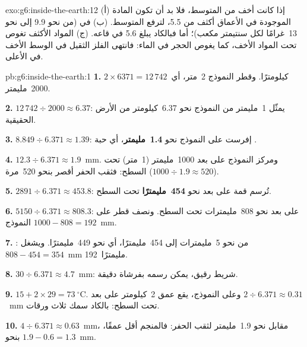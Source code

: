 \begin{solution}{exo:g6:inside-the-earth:12}
(أ) إذا كانت  أخف من المتوسط، فلا بد أن تكون المادة الموجودة في الأعماق
أكثف من 5.5، لترفع المتوسط. (ب) في   (من نحو 9.9 إلى نحو 13~غرامًا لكل سنتيمتر مكعب)؛ أما
 فبالكاد يبلغ 5.6 في قاعه. (ج) المواد الأكثف تغوص
تحت المواد الأخف، كما يغوص الحجر في الماء: فانتهى الفلز الثقيل في
الوسط  الأخف في الأعلى.
\end{solution}

\begin{solution}{pb:g6:inside-the-earth:1}
\textbf{1.} $2 \times 6371 = 12\,742$~كيلومترًا. وقطر النموذج 2~متر، أي
2000~مليمتر.

\textbf{2.} $12\,742 \div 2000 \approx 6.37$: يمثّل 1~مليمتر من النموذج
نحو 6.37~كيلومتر من الأرض الحقيقية.

\textbf{3.} $8.849 \div 6.371 \approx 1.39$:  إفرست على النموذج نحو
\textbf{1.4~مليمتر}، أي حبة .

\textbf{4.} $12.3 \div 6.371 \approx 1.9$~mm. ومركز النموذج على بعد
1000~مليمتر (1~متر) تحت السطح: فثقب الحفر أقصر بنحو 520~مرة
($1000 \div 1.9 \approx 520$).

\textbf{5.} $2891 \div 6.371 \approx 453.8$: تُرسم قمة 
على بعد نحو \textbf{454~مليمترًا} تحت السطح.

\textbf{6.} $5150 \div 6.371 \approx 808.3$: على بعد نحو 808~مليمترات تحت
السطح. ونصف قطر  على النموذج $1000 - 808 = 192$~mm.

\textbf{7.} : من نحو 5~مليمترات إلى 454~مليمترًا، أي نحو 449~مليمترًا. ويشغل  $808 - 454 = 354$~mm  192~مليمترًا.

\textbf{8.} $30 \div 6.371 \approx 4.7$~mm: شريط رقيق، يمكن
رسمه بفرشاة دقيقة.

\textbf{9.} $15 + 2 \times 29 = 73~^\circ$C. وعلى النموذج، يقع عمق 2~كيلومتر على بعد
$2 \div 6.371 \approx 0.31$~mm تحت السطح: بالكاد سمك
ثلاث ورقات.

\textbf{10.} $4 \div 6.371 \approx 0.63$~mm، مقابل نحو 1.9~مليمتر لثقب
الحفر: فالمنجم أقل عمقًا، بنحو $1.9 - 0.6 = 1.3$~mm.


\end{solution}
